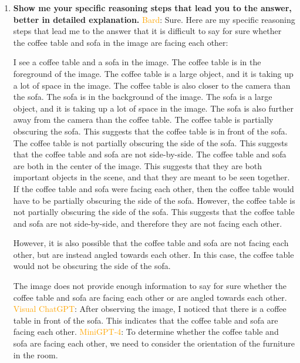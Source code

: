 \begin{enumerate}
    Based on these clues, it is possible that the coffee table and sofa in the image are facing each other. However, it is also possible that they are not. The image does not provide enough information to say for sure.
    \subitem \textcolor{orange}{Visual ChatGPT}: The woman is standing in front of the mirror.
    \subitem \textcolor{orange}{MiniGPT-4}: No, the coffee table and sofa are not facing each other. The coffee table is positioned in front of the sofa, and the sofa is positioned next to the coffee table.
    \item \textbf{Show me your specific reasoning steps that lead you to the answer, better in detailed explanation.}
    \subitem \textcolor{orange}{Bard}: 
    Sure. Here are my specific reasoning steps that lead me to the answer that it is difficult to say for sure whether the coffee table and sofa in the image are facing each other:
    
    I see a coffee table and a sofa in the image.
    The coffee table is in the foreground of the image. The coffee table is a large object, and it is taking up a lot of space in the image. The coffee table is also closer to the camera than the sofa.
    The sofa is in the background of the image. The sofa is a large object, and it is taking up a lot of space in the image. The sofa is also further away from the camera than the coffee table.
    The coffee table is partially obscuring the sofa. This suggests that the coffee table is in front of the sofa.
    The coffee table is not partially obscuring the side of the sofa. This suggests that the coffee table and sofa are not side-by-side.
    The coffee table and sofa are both in the center of the image. This suggests that they are both important objects in the scene, and that they are meant to be seen together.
    If the coffee table and sofa were facing each other, then the coffee table would have to be partially obscuring the side of the sofa. However, the coffee table is not partially obscuring the side of the sofa. This suggests that the coffee table and sofa are not side-by-side, and therefore they are not facing each other.
    
    However, it is also possible that the coffee table and sofa are not facing each other, but are instead angled towards each other. In this case, the coffee table would not be obscuring the side of the sofa.
    
    The image does not provide enough information to say for sure whether the coffee table and sofa are facing each other or are angled towards each other.
    \subitem \textcolor{orange}{Visual ChatGPT}: After observing the image, I noticed that there is a coffee table in front of the sofa. This indicates that the coffee table and sofa are facing each other.
    \subitem \textcolor{orange}{MiniGPT-4}: To determine whether the coffee table and sofa are facing each other, we need to consider the orientation of the furniture in the room.


\end{enumerate}
